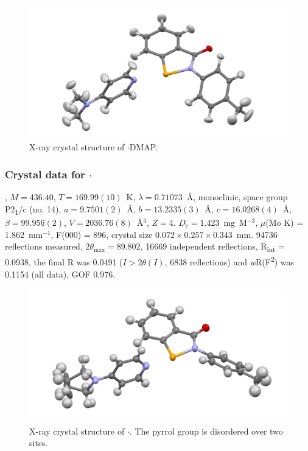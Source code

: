 \begin{refsection}
\begin{figure}
  \includegraphics[width=0.6\linewidth]{Figures/ebs-4me-dmap-xtal.pdf}
  \caption{X-ray crystal structure of \texorpdfstring{$ \cdot $DMAP}{C21 H21 N3 O Se}.}
\end{figure}

\subsubsection{Crystal data for \texorpdfstring{$ \cdot $}{C23 H23 N3 O Se}}
, $M=436.40$, $T=169.99(10)$~K, $ \lambda=0.71073 $~\AA, monoclinic, space group P2\textsubscript{1}/c (no. 14), $a = 9.7501(2)$~\AA, $b = 13.2335(3)$~\AA, $c = 16.0268(4)$~\AA, $\beta = 99.956(2)$\degree, $V = 2036.76(8)$~\AA$^{3}$, $Z = 4$. $D_{c}= 1.423$~mg~M$^{-3}$, $\mu$(Mo K\a) = 1.862~mm$^{-1}$, F(000) = 896, crystal size $0.072 \times 0.257 \times 0.343$~mm. 94736 reflections measured, $2\theta_{\max}=89.802$\degree, 16669 independent reflections, R\textsubscript{int} = 0.0938, the final R was 0.0491 ($I > 2\theta(I)$, 6838 reflections) and \textit{w}R(F\textsuperscript{2}) was 0.1154 (all data), GOF 0.976.

\begin{figure}
  \includegraphics[width=0.6\linewidth]{Figures/ebs-4me-pyrrol-xtal.pdf}
  \caption[X-ray crystal structure of \texorpdfstring{$ \cdot $}{C23 H23 N3 O Se}.]{X-ray crystal structure of \texorpdfstring{$ \cdot $}{C23 H23 N3 O Se}. The pyrrol group is disordered over two sites.}
\end{figure}


\end{refsection}
